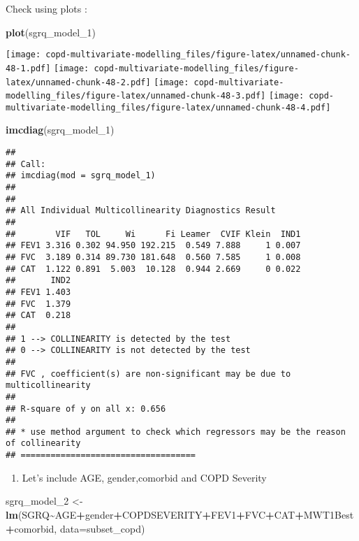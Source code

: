 \documentclass[
]{article}
\newenvironment{Shaded}{\begin{snugshade}}{\end{snugshade}}
\newcommand{\AttributeTok}[1]{\textcolor[rgb]{0.13,0.29,0.53}{#1}}
\newcommand{\FunctionTok}[1]{\textcolor[rgb]{0.13,0.29,0.53}{\textbf{#1}}}
\newcommand{\NormalTok}[1]{#1}
\newcommand{\OtherTok}[1]{\textcolor[rgb]{0.56,0.35,0.01}{#1}}
\newcommand{\SpecialCharTok}[1]{\textcolor[rgb]{0.81,0.36,0.00}{\textbf{#1}}}
\providecommand{\tightlist}{%
  \setlength{\itemsep}{0pt}\setlength{\parskip}{0pt}}
\begin{document}
Check using plots :

\begin{Shaded}
\begin{Highlighting}[]
\FunctionTok{plot}\NormalTok{(sgrq\_model\_1)}
\end{Highlighting}
\end{Shaded}

\texttt{[image: copd-multivariate-modelling\_files/figure-latex/unnamed-chunk-48-1.pdf]}
\texttt{[image: copd-multivariate-modelling\_files/figure-latex/unnamed-chunk-48-2.pdf]}
\texttt{[image: copd-multivariate-modelling\_files/figure-latex/unnamed-chunk-48-3.pdf]}
\texttt{[image: copd-multivariate-modelling\_files/figure-latex/unnamed-chunk-48-4.pdf]}

\begin{Shaded}
\begin{Highlighting}[]
\FunctionTok{imcdiag}\NormalTok{(sgrq\_model\_1)}
\end{Highlighting}
\end{Shaded}

\begin{verbatim}
## 
## Call:
## imcdiag(mod = sgrq_model_1)
## 
## 
## All Individual Multicollinearity Diagnostics Result
## 
##        VIF   TOL     Wi      Fi Leamer  CVIF Klein  IND1
## FEV1 3.316 0.302 94.950 192.215  0.549 7.888     1 0.007
## FVC  3.189 0.314 89.730 181.648  0.560 7.585     1 0.008
## CAT  1.122 0.891  5.003  10.128  0.944 2.669     0 0.022
##       IND2
## FEV1 1.403
## FVC  1.379
## CAT  0.218
## 
## 1 --> COLLINEARITY is detected by the test 
## 0 --> COLLINEARITY is not detected by the test
## 
## FVC , coefficient(s) are non-significant may be due to multicollinearity
## 
## R-square of y on all x: 0.656 
## 
## * use method argument to check which regressors may be the reason of collinearity
## ===================================
\end{verbatim}

\begin{enumerate}
\def\labelenumi{\arabic{enumi}.}
\setcounter{enumi}{1}
\tightlist
\item
  Let's include AGE, gender,comorbid and COPD Severity
\end{enumerate}

\begin{Shaded}
\begin{Highlighting}[]
\NormalTok{sgrq\_model\_2 }\OtherTok{\textless{}{-}} \FunctionTok{lm}\NormalTok{(SGRQ}\SpecialCharTok{\textasciitilde{}}\NormalTok{AGE}\SpecialCharTok{+}\NormalTok{gender}\SpecialCharTok{+}\NormalTok{COPDSEVERITY}\SpecialCharTok{+}\NormalTok{FEV1}\SpecialCharTok{+}\NormalTok{FVC}\SpecialCharTok{+}\NormalTok{CAT}\SpecialCharTok{+}\NormalTok{MWT1Best}\SpecialCharTok{+}\NormalTok{comorbid, }\AttributeTok{data=}\NormalTok{subset\_copd)}
\end{Highlighting}
\end{Shaded}
\end{document}
